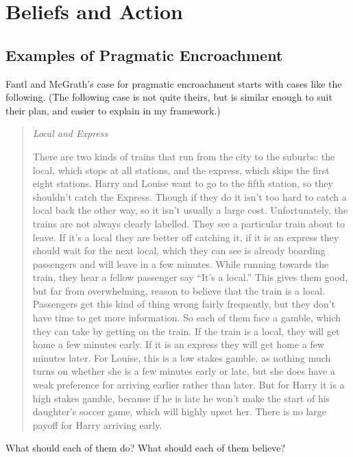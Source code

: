 \chapter{Beliefs and Action}

\section{Examples of Pragmatic Encroachment}

Fantl and McGrath's case for pragmatic encroachment starts with cases like the following. (The following case is not quite theirs, but is similar enough to suit their plan, and easier to explain in my framework.)

\begin{quote}
\textit{Local and Express}

\noindent There are two kinds of trains that run from the city to the suburbs: the local, which stops at all stations, and the express, which skips the first eight stations. Harry and Louise want to go to the fifth station, so they shouldn't catch the Express. Though if they do it isn't too hard to catch a local back the other way, so it isn't usually a large cost. Unfortunately, the trains are not always clearly labelled. They see a particular train about to leave. If it's a local they are better off catching it, if it is an express they should wait for the next local, which they can see is already boarding passengers and will leave in a few minutes. While running towards the train, they hear a fellow passenger say ``It's a local.'' This gives them good, but far from overwhelming, reason to believe that the train is a local. Passengers get this kind of thing wrong fairly frequently, but they don't have time to get more information. So each of them face a gamble, which they can take by getting on the train. If the train is a local, they will get home a few minutes early. If it is an express they will get home a few minutes later. For Louise, this is a low stakes gamble, as nothing much turns on whether she is a few minutes early or late, but she does have a weak preference for arriving earlier rather than later. But for Harry it is a high stakes gamble, because if he is late he won't make the start of his daughter's soccer game, which will highly upset her. There is no large payoff for Harry arriving early. 
\end{quote}

\noindent What should each of them do? What should each of them believe?

